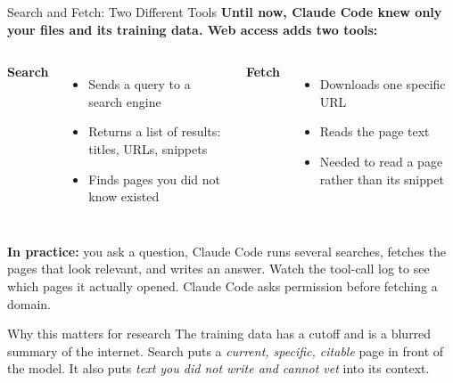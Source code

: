 \documentclass[aspectratio=169, 11pt]{beamer}
\begin{document}
\begin{frame}[shrink=6]{Search and Fetch: Two Different Tools}
  \textbf{Until now, Claude Code knew only your files and its training data. Web access adds two tools:}

  \vspace{0.5em}
  \begin{columns}[T]
    \textbf{Search}
    \begin{itemize}\small
      \item Sends a query to a search engine
      \item Returns a list of results: titles, URLs, snippets
      \item Finds pages you did not know existed
    \end{itemize}

    \textbf{Fetch}
    \begin{itemize}\small
      \item Downloads one specific URL
      \item Reads the page text
      \item Needed to read a page rather than its snippet
    \end{itemize}
  \end{columns}

  \vspace{0.6em}
  \textbf{In practice:} you ask a question, Claude Code runs several searches, fetches the pages that look relevant, and writes an answer. Watch the tool-call log to see which pages it actually opened. Claude Code asks permission before fetching a domain.

  \vspace{0.5em}
  \begin{block}{Why this matters for research}
    The training data has a cutoff and is a blurred summary of the internet. Search puts a \emph{current, specific, citable} page in front of the model. It also puts \emph{text you did not write and cannot vet} into its context.
  \end{block}
\end{frame}
\end{document}
